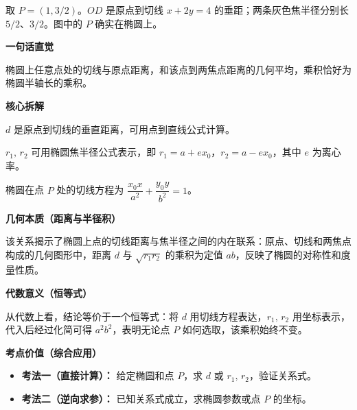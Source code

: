 \begin{explanationbox}
\begin{minipage}{\linewidth}
\begin{center}\end{center}
取 $P=(1,3/2)$。$OD$ 是原点到切线 $x+2y=4$ 的垂距；两条灰色焦半径分别长 $5/2$、$3/2$。图中的 $P$ 确实在椭圆上。
\end{minipage}
\par\medskip

\textbf{\textcolor{CExplanation}{一句话直觉}}

椭圆上任意点处的切线与原点距离，和该点到两焦点距离的几何平均，乘积恰好为椭圆半轴长的乘积。

\par\medskip\noindent
\textbf{\textcolor{CExplanation}{核心拆解}}
\begin{description}[style=nextline, leftmargin=2.8em, labelsep=0.5em, itemsep=0.45em]
    \item[\textbf{要点一（距离定义）：}] $d$ 是原点到切线的垂直距离，可用点到直线公式计算。
    \item[\textbf{要点二（焦半径公式）：}] $r_1,\,r_2$ 可用椭圆焦半径公式表示，即 $r_1 = a + e x_0$，$r_2 = a - e x_0$，其中 $e$ 为离心率。
    \item[\textbf{要点三（切线方程）：}] 椭圆在点 $P$ 处的切线方程为 $\dfrac{x_0 x}{a^2} + \dfrac{y_0 y}{b^2} = 1$。
\end{description}

\par\medskip\noindent
\textbf{\textcolor{CExplanation}{几何本质（距离与半径积）}}

该关系揭示了椭圆上点的切线距离与焦半径之间的内在联系：原点、切线和两焦点构成的几何图形中，距离 $d$ 与 $\sqrt{r_1 r_2}$ 的乘积为定值 $ab$，反映了椭圆的对称性和度量性质。

\par\medskip\noindent
\textbf{\textcolor{CExplanation}{代数意义（恒等式）}}

从代数上看，结论等价于一个恒等式：将 $d$ 用切线方程表达，$r_1,\,r_2$ 用坐标表示，代入后经过化简可得 $a^2 b^2$，表明无论点 $P$ 如何选取，该乘积始终不变。

\par\medskip\noindent
\textbf{\textcolor{CExplanation}{考点价值（综合应用）}}
\begin{itemize}[leftmargin=*, itemsep=0.5em, topsep=0.4em]
    \item \textbf{考法一（直接计算）：} 给定椭圆和点 $P$，求 $d$ 或 $r_1,\,r_2$，验证关系式。
    \item \textbf{考法二（逆向求参）：} 已知关系式成立，求椭圆参数或点 $P$ 的坐标。
\end{itemize}


\end{explanationbox}
